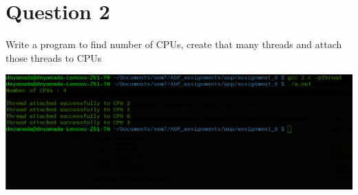 \documentclass[main.tex]{subfiles}
\begin{document}
\section{Question 2}
Write a program to find number of CPUs, create that many threads and attach
those threads to CPUs


\includegraphics[width=\textwidth]{figures/2_output.png}
\end{document}
